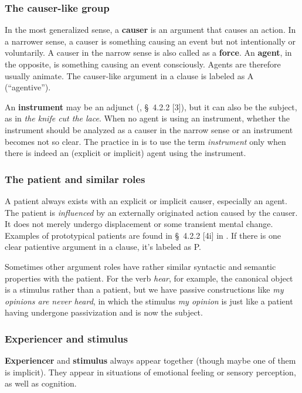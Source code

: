 \documentclass[UTF8, a4paper, oneside, scheme=plain]{ctexrep}
\newcommand*{\citesec}[1]{\S~{#1}}
\newcommand*{\concept}[1]{\textbf{#1}}
\newcommand*{\term}[1]{\emph{#1}}
\newcommand{\corpus}[1]{\emph{#1}}
\begin{document}
\subsubsection{The causer-like group}

In the most generalized sense,
a \concept{causer} is an argument that causes an action. 
In a narrower sense, a causer is something causing an event but not intentionally or voluntarily.
A causer in the narrow sense is also called as a \concept{force}.
An \concept{agent}, in the opposite, is something causing an event consciously.
Agents are therefore usually animate.
The causer-like argument in a clause is labeled as A (``agentive'').

An \concept{instrument} may be an adjunct (\citealt{cgel}, \citesec{4.2.2} [3]),
but it can also be the subject, 
as in \corpus{the knife cut the lace}.
When no agent is using an instrument, 
whether the instrument should be analyzed as a causer in the narrow sense or an instrument
becomes not so clear.
The practice in \citet{cgel} is to use the term \term{instrument} only when 
there is indeed an (explicit or implicit) agent using the instrument.

\subsubsection{The patient and similar roles}

A patient always exists with an explicit or implicit causer, especially an agent.
The patient is \emph{influenced} by an externally originated action caused by the causer.
It does not merely undergo displacement or some transient mental change. 
Examples of prototypical patients are found in \citesec{4.2.2} [4i] in \citealt{cgel}.
If there is one clear patientive argument in a clause, it's labeled as P.

Sometimes other argument roles have rather similar syntactic and semantic properties with the patient.
For the verb \corpus{hear}, for example,
the canonical object is a stimulus rather than a patient,
but we have passive constructions like \corpus{my opinions are never heard},
in which the stimulus \corpus{my opinion} is just like 
a patient having undergone passivization and is now the subject.

\subsubsection{Experiencer and stimulus}

\concept{Experiencer} and \concept{stimulus} always appear together (though maybe one of them is implicit).
They appear in situations of emotional feeling or sensory perception, as well as cognition.
\end{document}
